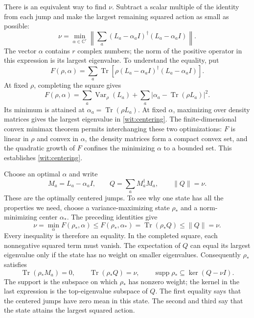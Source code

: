 \documentclass[11pt,a4paper]{article}
\numberwithin{equation}{section}
\theoremstyle{remark}
\DeclareMathOperator{\Tr}{Tr}
\DeclareMathOperator{\Var}{Var}
\begin{document}
There is an equivalent way to find $\nu$. Subtract a scalar multiple of
the identity from each jump and make the largest remaining squared
action as small as possible:
\begin{equation}
 \nu=\min_{\alpha\in\mathbb C^r}
 \left\|\sum_a(L_a-\alpha_a I)^\dagger(L_a-\alpha_a I)\right\|.
 \label{wit:centering}
\end{equation}
The vector $\alpha$ contains $r$ complex numbers; the norm of the positive
operator in this expression is its largest eigenvalue. To understand
the equality, put
\begin{equation}
 F(\rho,\alpha)=\sum_a\Tr\!\left[
 \rho(L_a-\alpha_aI)^\dagger(L_a-\alpha_aI)\right].
\end{equation}
At fixed $\rho$, completing the square gives
\begin{equation}
 F(\rho,\alpha)=\sum_a\Var_\rho(L_a)
 +\sum_a|\alpha_a-\Tr(\rho L_a)|^2.
\end{equation}
Its minimum is attained at $\alpha_a=\Tr(\rho L_a)$. At fixed
$\alpha$, maximizing over density matrices gives the largest eigenvalue
in \eqref{wit:centering}. The finite-dimensional convex minimax theorem
permits interchanging these two optimizations: $F$ is linear in $\rho$
and convex in $\alpha$, the density matrices form a compact convex set,
and the quadratic growth of $F$ confines the minimizing $\alpha$ to a
bounded set. This establishes \eqref{wit:centering}.

Choose an optimal $\alpha$ and write
\begin{equation}
 M_a=L_a-\alpha_aI,\qquad
 Q=\sum_aM_a^\dagger M_a,\qquad \|Q\|=\nu.
 \label{wit:Q}
\end{equation}
These are the optimally centered jumps. To see why one state has all the
properties we need, choose a variance-maximizing state $\rho_*$ and a
norm-minimizing center $\alpha_*$. The preceding identities give
\begin{equation}
 \nu=\min_\alpha F(\rho_*,\alpha)
 \le F(\rho_*,\alpha_*)=\Tr(\rho_*Q)\le\|Q\|=\nu.
\end{equation}
Every inequality is therefore an equality. In the completed square, each
nonnegative squared term must vanish. The expectation of $Q$ can equal
its largest eigenvalue only if the state has no weight on smaller
eigenvalues. Consequently $\rho_*$ satisfies
\begin{equation}
 \Tr(\rho_*M_a)=0,\qquad
 \Tr(\rho_*Q)=\nu,\qquad
 \operatorname{supp}\rho_*\subseteq\ker(Q-\nu I).
 \label{wit:optimizer}
\end{equation}
The support is the subspace on which $\rho_*$ has nonzero weight; the
kernel in the last expression is the top-eigenvalue subspace of $Q$.
The first equality says that the centered jumps have zero mean in this
state. The second and third say that the state attains the largest
squared action.
\end{document}
